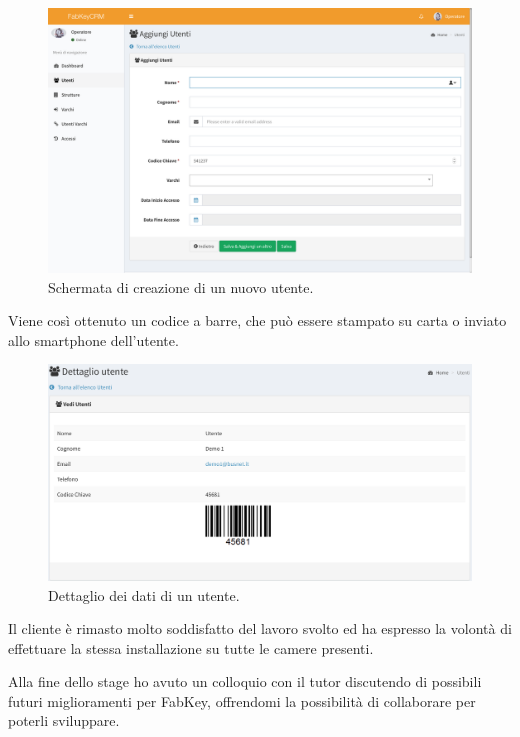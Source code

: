 \begin{figure}[H]
	\begin{center}
	\includegraphics[scale=0.25]{immagini/nuovo_utente.png}
	\caption{Schermata di creazione di un nuovo utente.}
	\end{center}
\end{figure}

Viene così ottenuto un codice a barre, che può essere stampato su carta o inviato allo smartphone dell'utente.

\begin{figure}[H]
	\begin{center}
	\includegraphics[scale=0.3]{immagini/utente_barcode.png}
	\caption{Dettaglio dei dati di un utente.}
	\end{center}
\end{figure}

Il cliente è rimasto molto soddisfatto del lavoro svolto ed ha espresso la volontà di effettuare la stessa installazione su tutte le camere presenti.

\medskip

Alla fine dello stage ho avuto un colloquio con il tutor discutendo di possibili futuri miglioramenti per FabKey, offrendomi la possibilità di collaborare per poterli sviluppare.
